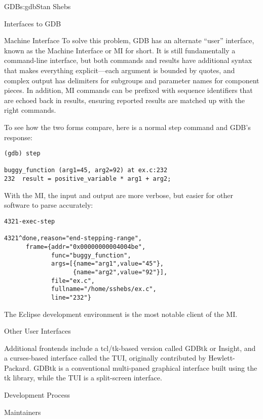 \begin{aosachapter}{GDB}{s:gdb}{Stan Shebs}
\begin{aosasect1}{Interfaces to GDB}
\begin{aosasect2}{Machine Interface}
To solve this problem, GDB has an alternate ``user'' interface, known
as the Machine Interface or MI for short.  It is still fundamentally a
command-line interface, but both commands and results have additional
syntax that makes everything explicit---each argument is bounded by
quotes, and complex output has delimiters for subgroups and
parameter names for component pieces.  In addition, MI commands can be
prefixed with sequence identifiers that are echoed back in results,
ensuring reported results are matched up with the right commands.

To see how the two forms compare, here is a normal step command
and GDB's response:
\begin{verbatim}
(gdb) step

buggy_function (arg1=45, arg2=92) at ex.c:232
232  result = positive_variable * arg1 + arg2;
\end{verbatim}
With the MI, the input and output are more verbose, but easier for
other software to parse accurately:
\begin{verbatim}
4321-exec-step

4321^done,reason="end-stepping-range",
      frame={addr="0x00000000004004be",
             func="buggy_function",
             args=[{name="arg1",value="45"},
                   {name="arg2",value="92"}],
             file="ex.c",
             fullname="/home/sshebs/ex.c",
             line="232"}
\end{verbatim}

\noindent The Eclipse\cite{bib:eclipse-home} development environment is the most
notable client of the MI.

\end{aosasect2}

\begin{aosasect2}{Other User Interfaces}

Additional frontends include a tcl/tk-based version called GDBtk or
Insight, and a curses-based interface called the TUI, originally
contributed by Hewlett-Packard.  GDBtk is a conventional multi-paned
graphical interface built using the tk library, while the TUI is a
split-screen interface.

\end{aosasect2}

\end{aosasect1}

\begin{aosasect1}{Development Process}

\begin{aosasect2}{Maintainers}


\end{aosasect2}
\end{aosasect1}
\end{aosachapter}

